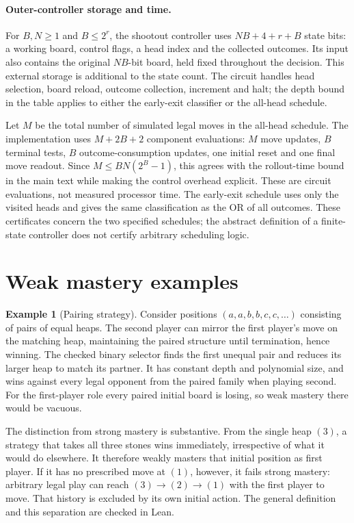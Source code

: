 \documentclass[11pt]{article}
\theoremstyle{plain}
\theoremstyle{definition}
\newtheorem{example}{Example}
\theoremstyle{remark}
\numberwithin{equation}{section}
\begin{document}
\paragraph{Outer-controller storage and time.}
\label{par:controller-costs}
For $B,N\ge1$ and $B\le2^r$, the shootout controller uses $NB+4+r+B$ state bits: a working board, control flags, a head index and the collected outcomes. Its input also contains the original $NB$-bit board, held fixed throughout the decision. This external storage is additional to the state count. The circuit handles head selection, board reload, outcome collection, increment and halt; the depth bound in the table applies to either the early-exit classifier or the all-head schedule.

Let $M$ be the total number of simulated legal moves in the all-head schedule. The implementation uses $M+2B+2$ component evaluations: $M$ move updates, $B$ terminal tests, $B$ outcome-consumption updates, one initial reset and one final move readout. Since $M\le BN(2^B-1)$, this agrees with the rollout-time bound in the main text while making the control overhead explicit. These are circuit evaluations, not measured processor time. The early-exit schedule uses only the visited heads and gives the same classification as the OR of all outcomes. These certificates concern the two specified schedules; the abstract definition of a finite-state controller does not certify arbitrary scheduling logic.

\section{Weak mastery examples}
\label{app:weak}

\begin{example}[Pairing strategy]
Consider positions $(a,a,b,b,c,c,\dots)$ consisting of pairs of equal heaps. The second player can mirror the first player’s move on the matching heap, maintaining the paired structure until termination, hence winning. The checked binary selector finds the first unequal pair and reduces its larger heap to match its partner. It has constant depth and polynomial size, and wins against every legal opponent from the paired family when playing second. For the first-player role every paired initial board is losing, so weak mastery there would be vacuous.
\end{example}

The distinction from strong mastery is substantive. From the single heap $(3)$, a strategy that takes all three stones wins immediately, irrespective of what it would do elsewhere. It therefore weakly masters that initial position as first player. If it has no prescribed move at $(1)$, however, it fails strong mastery: arbitrary legal play can reach $(3)\to(2)\to(1)$ with the first player to move. That history is excluded by its own initial action. The general definition and this separation are checked in Lean.
\end{document}
